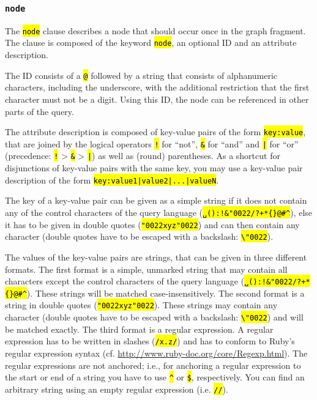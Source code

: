 \documentclass[12pt]{scrartcl}
\newcommand{\quo}{\char"0022}
\newcommand{\code}[1]{\hl{\texttt{#1}}}
\begin{document}
\subsubsection{\texttt{node}}\label{node}

The \code{node} clause describes a node that should occur once in the graph fragment.
The clause is composed of the keyword \code{node}, an optional ID and an attribute description.

The ID consists of a \code{@} followed by a string that consists of alphanumeric characters, including the underscore, with the additional restriction that the first character must not be a digit.
Using this ID, the node can be referenced in other parts of the query.

The attribute description is composed of key-value pairs of the form \code{key:value}, that are joined by the logical operators \code{!} for “not”, \code{\&} for “and” and \code{|} for “or” (precedence: \code{!} > \code{\&} > \code{|}) as well as (round) parentheses.
As a shortcut for disjunctions of key-value pairs with the same key, you may use a key-value pair description of the form \code{key:value1|value2|...|valueN}.

The key of a key-value pair can be given as a simple string if it does not contain any of the control characters of the query language (\code{␣():!\&\quo/?+*\{\}@\#\textasciicircum}), else it has to be given in double quotes (\code{{\quo}xyz\quo}) and can then contain any character (double quotes have to be escaped with a backslash: \code{\textbackslash\quo}).

\label{zeichenketten}The values of the key-value pairs are strings, that can be given in three different formats.
The first format is a simple, unmarked string that may contain all characters except the control characters of the query language (\code{␣():!\&\quo/?+*\{\}@\#\textasciicircum}).
These strings will be matched case-insensitively.
The second format is a string in double quotes (\code{{\quo}xyz\quo}).
These strings may contain any character (double quotes have to be escaped with a backslash: \code{\textbackslash\quo}) and will be matched exactly.
The third format is a regular expression.
A regular expression has to be written in slashes (\code{/x.z/}) and has to conform to Ruby’s regular expression syntax (cf. \url{http://www.ruby-doc.org/core/Regexp.html}).
The regular expressions are not anchored; i.e., for anchoring a regular expression to the start or end of a string you have to use \code{\textasciicircum} or \code{\$}, respectively.
You can find an arbitrary string using an empty regular expression (i.e. \code{//}).
\end{document}
